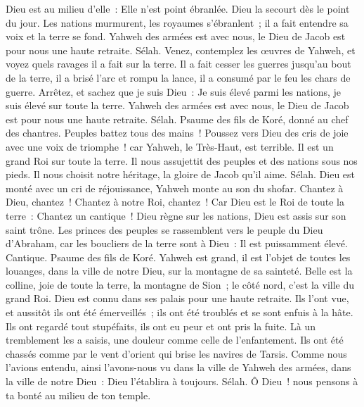 \begin{multicols}{2}
Dieu est au milieu d'elle~: Elle n'est point ébranlée. Dieu la secourt dès le point du jour.
Les nations murmurent, les royaumes s'ébranlent~; il a fait entendre sa voix et la terre se fond.
Yahweh des armées est avec nous, le Dieu de Jacob est pour nous une haute retraite. Sélah.
Venez, contemplez les œuvres de Yahweh, et voyez quels ravages il a fait sur la terre.
Il a fait cesser les guerres jusqu'au bout de la terre, il a brisé l'arc et rompu la lance, il a consumé par le feu les chars de guerre.
Arrêtez, et sachez que je suis Dieu~: Je suis élevé parmi les nations, je suis élevé sur toute la terre.
Yahweh des armées est avec nous, le Dieu de Jacob est pour nous une haute retraite. Sélah.
\VerseOne{}Psaume des fils de Koré, donné au chef des chantres.
Peuples battez tous des mains~! Poussez vers Dieu des cris de joie avec une voix de triomphe~!
car Yahweh, le Très-Haut, est terrible. Il est un grand Roi sur toute la terre.
Il nous assujettit des peuples et des nations sous nos pieds.
Il nous choisit notre héritage, la gloire de Jacob qu'il aime. Sélah.
Dieu est monté avec un cri de réjouissance, Yahweh monte au son du shofar.
Chantez à Dieu, chantez~! Chantez à notre Roi, chantez~!
Car Dieu est le Roi de toute la terre~: Chantez un cantique~!
Dieu règne sur les nations, Dieu est assis sur son saint trône.
Les princes des peuples se rassemblent vers le peuple du Dieu d'Abraham, car les boucliers de la terre sont à Dieu~: Il est puissamment élevé.
\VerseOne{}Cantique. Psaume des fils de Koré.
Yahweh est grand, il est l'objet de toutes les louanges, dans la ville de notre Dieu, sur la montagne de sa sainteté.
Belle est la colline, joie de toute la terre, la montagne de Sion~; le côté nord, c'est la ville du grand Roi.
Dieu est connu dans ses palais pour une haute retraite.
Ils l'ont vue, et aussitôt ils ont été émerveillés~; ils ont été troublés et se sont enfuis à la hâte.
Ils ont regardé tout stupéfaits, ils ont eu peur et ont pris la fuite.
Là un tremblement les a saisis, une douleur comme celle de l'enfantement.
Ils ont été chassés comme par le vent d'orient qui brise les navires de Tarsis.
Comme nous l'avions entendu, ainsi l'avons-nous vu dans la ville de Yahweh des armées, dans la ville de notre Dieu~: Dieu l'établira à toujours. Sélah.
Ô Dieu~! nous pensons à ta bonté au milieu de ton temple.

\end{multicols}
